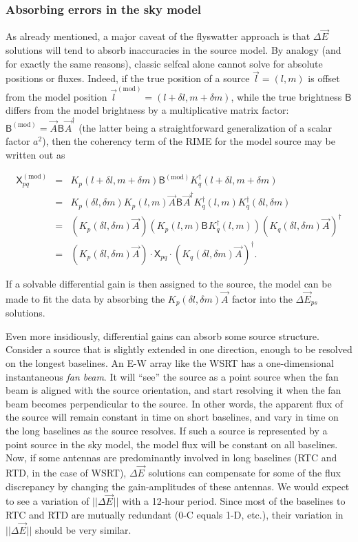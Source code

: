 \documentclass[]{aa}
\newcommand{\jones}[2]{\vec {#1}_{#2}}
\newcommand{\jonesT}[2]{\vec {#1}^\dagger_{#2}}
\newcommand{\coh}[2]{\mathsf{{#1}}_{{#2}}}
\begin{document}
\subsubsection{Absorbing errors in the sky model\label{sec:de-analysis-model}}

As already mentioned, a major caveat of the flyswatter approach is that $\Delta\jones{E}{}$ solutions will tend to absorb inaccuracies in the source model. By analogy (and for exactly the same reasons), classic selfcal 
alone cannot solve for absolute positions or fluxes. Indeed, if the true position of a source $\vec l = (l,m)$ is offset from the model position $\vec l^\mathrm{(mod)} = (l+\delta l,m + \delta m)$, while the true brightness $\coh{B}{}$ differs from the model brightness by a multiplicative matrix factor: $\coh{B}{}^\mathrm{(mod)} = \jones{A}{} \coh{B}{} \jonesT{A}{}$ (the latter being a straightforward generalization of a scalar factor $a^2$), then the coherency term of the RIME for the model source may be written out as

\begin{eqnarray*}
\coh{X}{pq}^\mathrm{(mod)} & = & K_{p}(l+\delta l,m+\delta m) \coh{B}{}^\mathrm{(mod)} K^\dagger_{q}(l+\delta l,m+\delta m) \\
 & = & K_{p}(\delta l,\delta m) K_{p}(l,m) \jones{A}{}\coh{B}{}\jonesT{A}{} K^\dagger_{q}(l,m) K^\dagger_{q}(\delta l,\delta m) \\
 & = & (K_{p}(\delta l,\delta m)\jones{A}{})(K_{p}(l,m)\coh{B}{}K^\dagger_{q}(l,m))(K_{q}(\delta l,\delta m)\jones{A}{})^\dagger \\
 & = & (K_{p}(\delta l,\delta m)\jones{A}{}) 
       \cdot \coh{X}{pq} \cdot 
       (K_{q}(\delta l,\delta m)\jones{A}{})^\dagger.
\end{eqnarray*}

If a solvable differential gain is then assigned to the source, the model can be made to fit the data by absorbing the $K_{p}(\delta l,\delta m)\jones{A}{}$ factor into the $\Delta\jones{E}{ps}$ solutions.

Even more insidiously, differential gains can absorb some source structure. Consider a source that is slightly extended in one direction, enough to be resolved on the longest baselines. An E-W array like the WSRT has a one-dimensional instantaneous {\em fan beam}. It will ``see'' the source as a point source when the fan beam is aligned with the source orientation, and start resolving it when the fan beam becomes perpendicular to the source. In other words, the apparent flux of the source will remain constant in time on short baselines, and vary in time on the long baselines as the source resolves. If such a source is represented by a point source in the sky model, the model flux will be constant on all baselines. Now, if some antennas are predominantly involved in long baselines (RTC and RTD, in the case of WSRT), $\Delta\jones{E}{}$ solutions can compensate for some of the flux discrepancy by changing the gain-amplitudes of these antennas. We would expect to see a variation of $||\Delta\jones{E}{}||$ with a 12-hour period. Since most of the baselines to RTC and RTD are mutually redundant (0-C equals 1-D, etc.), their variation in $||\Delta\jones{E}{}||$ should be very similar. 
\end{document}

